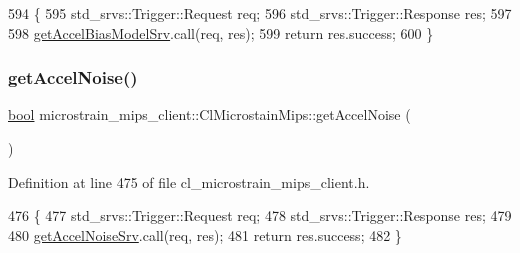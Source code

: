 \begin{DoxyCode}
594     \{
595         std\_srvs::Trigger::Request req;
596         std\_srvs::Trigger::Response res;
597 
598         \hyperlink{classmicrostrain__mips__client_1_1ClMicrostainMips_abe4cc6fa8c43eedd69b7dc53f2cc63f5}{getAccelBiasModelSrv}.call(req, res);
599         \textcolor{keywordflow}{return} res.success;
600     \}
\end{DoxyCode}
\mbox{\label{classmicrostrain__mips__client_1_1ClMicrostainMips_a91a6566796afe3f3fcabc409535478f2}} 
\subsubsection{\texorpdfstring{get\+Accel\+Noise()}{getAccelNoise()}}
{\footnotesize\ttfamily \hyperlink{classbool}{bool} microstrain\+\_\+mips\+\_\+client\+::\+Cl\+Microstain\+Mips\+::get\+Accel\+Noise (\begin{DoxyParamCaption}{ }\end{DoxyParamCaption})\hspace{0.3cm}{\ttfamily [inline]}}



Definition at line 475 of file cl\+\_\+microstrain\+\_\+mips\+\_\+client.\+h.


\begin{DoxyCode}
476     \{
477         std\_srvs::Trigger::Request req;
478         std\_srvs::Trigger::Response res;
479 
480         \hyperlink{classmicrostrain__mips__client_1_1ClMicrostainMips_a3c8688daacb1472f90d788e186de6643}{getAccelNoiseSrv}.call(req, res);
481         \textcolor{keywordflow}{return} res.success;
482     \}
\end{DoxyCode}
\mbox{\label{classmicrostrain__mips__client_1_1ClMicrostainMips_ad0253fe97de1c6be89f37b63e0f34428}} 

